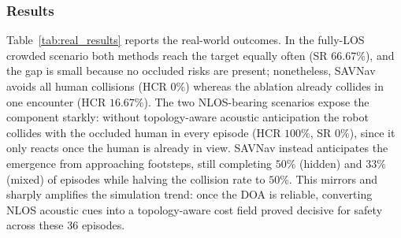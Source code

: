 \begin{table}[t]
	\centering
	\caption{Real-world evaluation on a physical Stretch~3 robot ($36$ episodes; $6$ per method and scenario; all values as percentages). Both methods share our perception stack; the direction of arrival is provided as ground truth. Bold marks the better value per column within each scenario.}
	\label{tab:real_results}
	\setlength{\tabcolsep}{3pt}
\end{table}

\subsubsection{Results}
Table~\ref{tab:real_results} reports the real-world outcomes. In the fully-LOS crowded scenario both methods reach the target equally often (SR $66.67\%$), and the gap is small because no occluded risks are present; nonetheless, SAVNav avoids all human collisions (HCR $0\%$) whereas the ablation already collides in one encounter (HCR $16.67\%$). The two NLOS-bearing scenarios expose the component starkly: without topology-aware acoustic anticipation the robot collides with the occluded human in every episode (HCR $100\%$, SR $0\%$), since it only reacts once the human is already in view. SAVNav instead anticipates the emergence from approaching footsteps, still completing $50\%$ (hidden) and $33\%$ (mixed) of episodes while halving the collision rate to $50\%$. This mirrors and sharply amplifies the simulation trend: once the DOA is reliable, converting NLOS acoustic cues into a topology-aware cost field proved decisive for safety across these 36 episodes.

